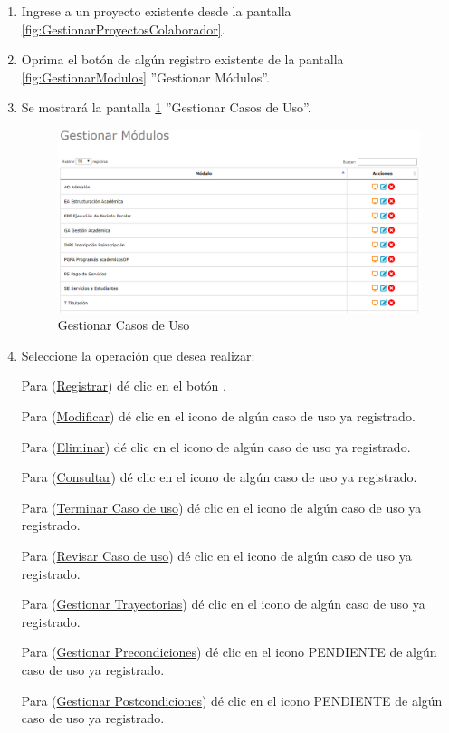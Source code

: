 			\begin{enumerate}
				
			\item Ingrese a un proyecto existente desde la pantalla \ref{fig:GestionarProyectosColaborador}.
			
			\item Oprima el botón \IUCU{} de algún registro existente de la pantalla \ref{fig:GestionarModulos} ''Gestionar Módulos''.
	
			\item Se mostrará la pantalla \ref{fig:GestionarCU} ''Gestionar Casos de Uso''.

			\begin{figure}[htbp!]
				\begin{center}
					\includegraphics[scale=0.6]{roles/lider/casosUso/pantallas/IU5gestionarModulos}
					\caption{Gestionar Casos de Uso}
					\label{fig:GestionarCU}
				\end{center}
			\end{figure}
		
				\item Seleccione la operación que desea realizar:
			
			Para (\hyperlink{cv:registrarCU}{Registrar}) dé clic en el botón \IURegistrar.
			
			Para (\hyperlink{cv:modificarCU}{Modificar}) dé clic en el icono \IUEditar{} de algún caso de uso ya registrado.
			
			Para (\hyperlink{cv:eliminarCU}{Eliminar}) dé clic en el icono \IUBotonEliminar{} de algún caso de uso ya registrado.
			
			Para (\hyperlink{cv:consultarCU}{Consultar}) dé clic en el icono \IUConsultar{} de algún caso de uso ya registrado.
			
			Para (\hyperlink{cv:terminarCU}{Terminar Caso de uso}) dé clic en el icono \IUTerminar{} de algún caso de uso ya registrado.
			
			Para (\hyperlink{cv:revisarCU}{Revisar Caso de uso}) dé clic en el icono \IURevisar{} de algún caso de uso ya registrado.
			
			Para (\hyperlink{cv:GestionarTray}{Gestionar Trayectorias}) dé clic en el icono \IUTray{} de algún caso de uso ya registrado.
			
			Para (\hyperlink{cv:GestionarPrecondiciones}{Gestionar Precondiciones}) dé clic en el icono PENDIENTE de algún caso de uso ya registrado.
			
			Para (\hyperlink{cv:GestionarTray}{Gestionar Postcondiciones}) dé clic en el icono PENDIENTE de algún caso de uso ya registrado.
			\end{enumerate}